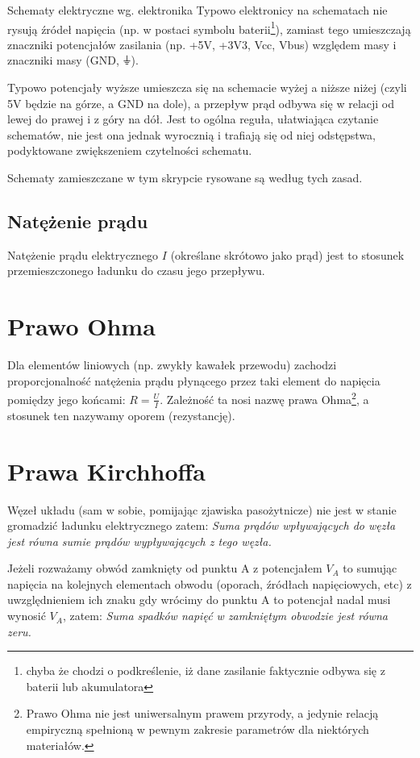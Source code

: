 \documentclass{pdfBooklets}
\begin{document}
\begin{ProTip}{Schematy elektryczne wg. elektronika}
Typowo elektronicy na schematach nie rysują źródeł napięcia (np. w postaci symbolu baterii\footnote{chyba że chodzi o podkreślenie, iż dane zasilanie faktycznie odbywa się z baterii lub akumulatora}),
zamiast tego umieszczają znaczniki potencjałów zasilania (np. +5V, +3V3, Vcc, Vbus) względem masy i znaczniki masy (GND, {\Symbola ⏚}).

\vspace{3pt}Typowo potencjały wyższe umieszcza się na schemacie wyżej a niższe niżej (czyli 5V będzie na górze, a GND na dole), a przepływ prąd odbywa się w relacji od lewej do prawej i z góry na dół.
Jest to ogólna reguła, ułatwiająca czytanie schematów, nie jest ona jednak wyrocznią i trafiają się od niej odstępstwa, podyktowane zwiększeniem czytelności schematu.

\vspace{3pt}Schematy zamieszczane w tym skrypcie rysowane są według tych zasad.
\end{ProTip}

\subsection{Natężenie prądu}
    Natężenie prądu elektrycznego $I$ (określane skrótowo jako prąd)
    jest to stosunek przemieszczonego ładunku do czasu jego przepływu.

\section{Prawo Ohma}
Dla elementów liniowych (np. zwykły kawałek przewodu) zachodzi proporcjonalność natężenia prądu płynącego przez taki element do napięcia pomiędzy jego końcami: $R=\frac{U}{I}$.
Zależność ta nosi nazwę prawa Ohma\footnote{Prawo Ohma nie jest uniwersalnym prawem przyrody, a jedynie relacją empiryczną spełnioną w pewnym zakresie parametrów dla niektórych materiałów.}, a stosunek ten nazywamy oporem (rezystancję).

\section{Prawa Kirchhoffa}
Węzeł układu (sam w sobie, pomijając zjawiska pasożytnicze) nie jest w stanie gromadzić ładunku elektrycznego zatem: \emph{Suma prądów wpływających do węzła jest równa sumie prądów wypływających z tego węzła.}

Jeżeli rozważamy obwód zamknięty od punktu A z potencjałem $V_A$ to sumując napięcia na kolejnych elementach obwodu (oporach, źródłach napięciowych, etc) z uwzględnieniem ich znaku gdy wrócimy do punktu A to potencjał nadal musi wynosić $V_A$, zatem: \emph{Suma spadków napięć w zamkniętym obwodzie jest równa zeru.}
\end{document}
